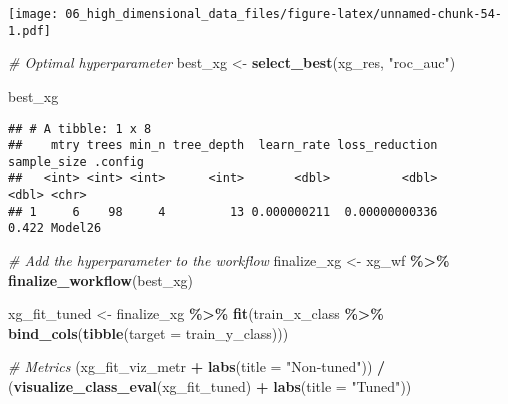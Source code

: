 \documentclass[
]{book}
\newenvironment{Shaded}{\begin{snugshade}}{\end{snugshade}}
\newcommand{\CommentTok}[1]{\textcolor[rgb]{0.56,0.35,0.01}{\textit{#1}}}
\newcommand{\DataTypeTok}[1]{\textcolor[rgb]{0.13,0.29,0.53}{#1}}
\newcommand{\KeywordTok}[1]{\textcolor[rgb]{0.13,0.29,0.53}{\textbf{#1}}}
\newcommand{\NormalTok}[1]{#1}
\newcommand{\OperatorTok}[1]{\textcolor[rgb]{0.81,0.36,0.00}{\textbf{#1}}}
\newcommand{\StringTok}[1]{\textcolor[rgb]{0.31,0.60,0.02}{#1}}
\begin{document}
\texttt{[image: 06\_high\_dimensional\_data\_files/figure-latex/unnamed-chunk-54-1.pdf]}

\begin{Shaded}
\begin{Highlighting}[]
\CommentTok{\# Optimal hyperparameter}
\NormalTok{best\_xg \textless{}{-}}\StringTok{ }\KeywordTok{select\_best}\NormalTok{(xg\_res, }\StringTok{"roc\_auc"}\NormalTok{)}

\NormalTok{best\_xg }
\end{Highlighting}
\end{Shaded}

\begin{verbatim}
## # A tibble: 1 x 8
##    mtry trees min_n tree_depth  learn_rate loss_reduction sample_size .config
##   <int> <int> <int>      <int>       <dbl>          <dbl>       <dbl> <chr>  
## 1     6    98     4         13 0.000000211  0.00000000336       0.422 Model26
\end{verbatim}

\begin{Shaded}
\begin{Highlighting}[]
\CommentTok{\# Add the hyperparameter to the workflow }
\NormalTok{finalize\_xg \textless{}{-}}\StringTok{ }\NormalTok{xg\_wf }\OperatorTok{\%\textgreater{}\%}
\StringTok{  }\KeywordTok{finalize\_workflow}\NormalTok{(best\_xg)}
\end{Highlighting}
\end{Shaded}

\begin{Shaded}
\begin{Highlighting}[]
\NormalTok{xg\_fit\_tuned \textless{}{-}}\StringTok{ }\NormalTok{finalize\_xg }\OperatorTok{\%\textgreater{}\%}\StringTok{ }
\StringTok{  }\KeywordTok{fit}\NormalTok{(train\_x\_class }\OperatorTok{\%\textgreater{}\%}\StringTok{ }\KeywordTok{bind\_cols}\NormalTok{(}\KeywordTok{tibble}\NormalTok{(}\DataTypeTok{target =}\NormalTok{ train\_y\_class)))}

\CommentTok{\# Metrics }
\NormalTok{(xg\_fit\_viz\_metr }\OperatorTok{+}\StringTok{ }\KeywordTok{labs}\NormalTok{(}\DataTypeTok{title =} \StringTok{"Non{-}tuned"}\NormalTok{)) }\OperatorTok{/}\StringTok{ }\NormalTok{(}\KeywordTok{visualize\_class\_eval}\NormalTok{(xg\_fit\_tuned) }\OperatorTok{+}\StringTok{ }\KeywordTok{labs}\NormalTok{(}\DataTypeTok{title =} \StringTok{"Tuned"}\NormalTok{))}
\end{Highlighting}
\end{Shaded}
\end{document}
